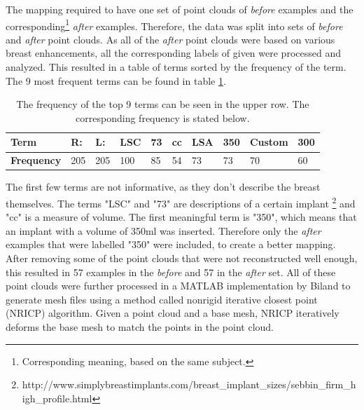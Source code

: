 The mapping required to have one set of point clouds of \textit{before} examples and the corresponding\footnote{Corresponding meaning, based on the same subject.} \textit{after} examples. Therefore, the data was split into sets of \textit{before} and \textit{after} point clouds. As all of the \textit{after} point clouds were based on various breast enhancements, all the corresponding labels of given were processed and analyzed. This resulted in a table of terms sorted by the frequency of the term. The 9 most frequent terms can be found in table \ref{tableTerms}.

\begin{table}[]
\centering
\begin{tabular}{|l|l|l|l|l|l|l|l|l|l|}
\hline
\textbf{Term}      & \textbf{R:} & \textbf{L:} & \textbf{LSC} & \textbf{73} & \textbf{cc} & \textbf{LSA} & \textbf{350} & \textbf{Custom} & \textbf{300} \\ \hline
\textbf{Frequency} & 205         & 205         & 100          & 85          & 54          & 73           & 73           & 70              & 60           \\ \hline
\end{tabular}
\caption[Table of most frequent terms]{The frequency of the top 9 terms can be seen in the upper row. The corresponding frequency is stated below.}
\label{tableTerms}
\end{table}

The first few terms are not informative, as they don't describe the breast themselves. The terms "LSC" and "73" are descriptions of a certain implant \footnote{http://www.simplybreastimplants.com/breast\_implant\_sizes/sebbin\_firm\_high\_profile.html} and "cc" is a measure of volume. The first meaningful term is "350", which means that an implant with a volume of 350ml was inserted. Therefore only the \textit{after} examples that were labelled "350" were included, to create a better mapping. After removing some of the point clouds that were not reconstructed well enough, this resulted in 57 examples in the \textit{before} and 57 in the \textit{after} set. All of these point clouds were further processed in a MATLAB implementation by Biland \cite{Biland17} to generate mesh files using a method called nonrigid iterative closest point (NRICP) algorithm. Given a point cloud and a base mesh, NRICP iteratively deforms the base mesh to match the points in the point cloud.

